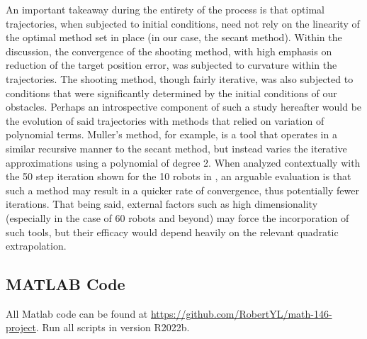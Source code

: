 \documentclass[11pt]{article}
\begin{document}
An important takeaway during the entirety of the process is that optimal trajectories, when subjected to initial conditions, need not rely on the linearity of the optimal method set in place (in our case, the secant method). Within the discussion, the convergence of the shooting method, with high emphasis on reduction of the target position error, was subjected to curvature within the trajectories. The shooting method, though fairly iterative, was also subjected to conditions that were significantly determined by the initial conditions of our obstacles. Perhaps an introspective component of such a study hereafter would be the evolution of said trajectories with methods that relied on variation of polynomial terms. Muller's method, for example, is a tool that operates in a similar recursive manner to the secant method, but instead varies the iterative approximations using a polynomial of degree 2. When analyzed contextually with the 50 step iteration shown for the 10 robots in , an arguable evaluation is that such a method may result in a quicker rate of convergence, thus potentially fewer iterations. That being said, external factors such as high dimensionality (especially in the case of 60 robots and beyond) may force the incorporation of such tools, but their efficacy would depend heavily on the relevant quadratic extrapolation.

\begin{appendices}

\section{MATLAB Code}

All Matlab code can be found at \url{https://github.com/RobertYL/math-146-project}. Run all scripts in version R2022b.

\end{appendices}
\end{document}
